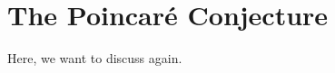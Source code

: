 \chapter{The Poincar\'e Conjecture}\label{chapter:poincare}

Here, we want to discuss \cite{dieck2008algebraic} again.

